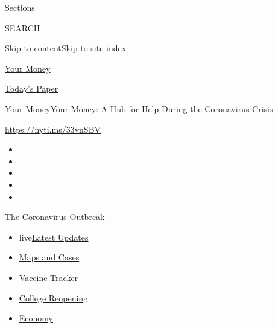 Sections

SEARCH

\protect\hyperlink{site-content}{Skip to
content}\protect\hyperlink{site-index}{Skip to site index}

\href{https://www.nytimes.com/section/your-money}{Your Money}

\href{https://myaccount.nytimes.com/auth/login?response_type=cookie\&client_id=vi}{}

\href{https://www.nytimes.com/section/todayspaper}{Today's Paper}

\href{/section/your-money}{Your Money}\textbar{}Your Money: A Hub for
Help During the Coronavirus Crisis

\url{https://nyti.ms/33vnSBV}

\begin{itemize}
\item
\item
\item
\item
\item
\end{itemize}

\href{https://www.nytimes.com/news-event/coronavirus?action=click\&pgtype=Article\&state=default\&region=TOP_BANNER\&context=storylines_menu}{The
Coronavirus Outbreak}

\begin{itemize}
\tightlist
\item
  live\href{https://www.nytimes.com/2020/08/04/world/coronavirus-cases.html?action=click\&pgtype=Article\&state=default\&region=TOP_BANNER\&context=storylines_menu}{Latest
  Updates}
\item
  \href{https://www.nytimes.com/interactive/2020/us/coronavirus-us-cases.html?action=click\&pgtype=Article\&state=default\&region=TOP_BANNER\&context=storylines_menu}{Maps
  and Cases}
\item
  \href{https://www.nytimes.com/interactive/2020/science/coronavirus-vaccine-tracker.html?action=click\&pgtype=Article\&state=default\&region=TOP_BANNER\&context=storylines_menu}{Vaccine
  Tracker}
\item
  \href{https://www.nytimes.com/2020/08/02/us/covid-college-reopening.html?action=click\&pgtype=Article\&state=default\&region=TOP_BANNER\&context=storylines_menu}{College
  Reopening}
\item
  \href{https://www.nytimes.com/live/2020/08/04/business/stock-market-today-coronavirus?action=click\&pgtype=Article\&state=default\&region=TOP_BANNER\&context=storylines_menu}{Economy}
\end{itemize}


